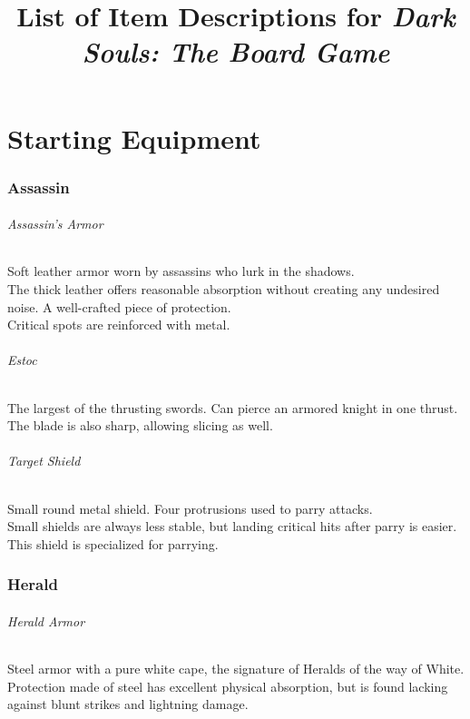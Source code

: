 \documentclass[twocolumn,a4paper]{article}
\begin{document}
\title{List of Item Descriptions for \emph{Dark Souls: The Board Game}}
\date{}
\maketitle
\tableofcontents %

\part{Starting Equipment}
\section*{Assassin}
\paragraph{Assassin's Armor}
Soft leather armor worn by assassins who lurk in the shadows.\\
The thick leather offers reasonable absorption without creating any undesired noise. A well-crafted piece of protection.\\
Critical spots are reinforced with metal.
\paragraph{Estoc}
The largest of the thrusting swords. Can pierce an armored knight in one thrust.\\
The blade is also sharp, allowing slicing as well.
\paragraph{Target Shield}
Small round metal shield. Four protrusions used to parry attacks.\\
Small shields are always less stable, but landing critical hits after parry is easier. This shield is specialized for parrying.
\section*{Herald}
\paragraph{Herald Armor}
Steel armor with a pure white cape, the signature of Heralds of the way of White.\\
Protection made of steel has excellent physical absorption, but is found lacking against blunt strikes and lightning damage.
\end{document}
